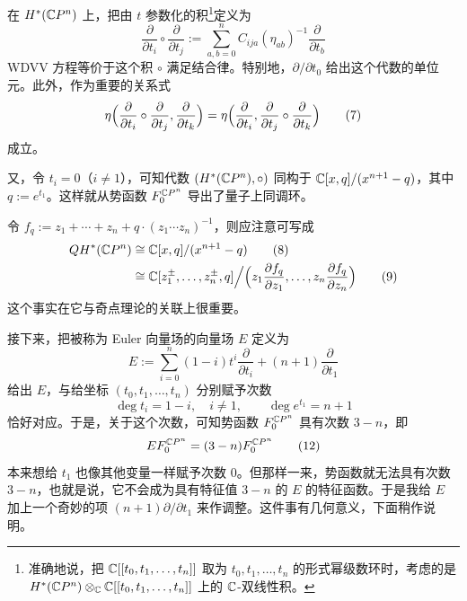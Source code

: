 在 $H^*(\mathbb{C}P^n)$ 上，把由 $t$ 参数化的积\footnote{准确地说，把 $\mathbb{C}[[t_0,t_1,\dots,t_n]]$ 取为 $t_0,t_1,\dots,t_n$ 的形式幂级数环时，考虑的是 $H^*(\mathbb{C}P^n)\otimes_{\mathbb{C}}\mathbb{C}[[t_0,t_1,\dots,t_n]]$ 上的 $\mathbb{C}$-双线性积。}定义为
\begin{equation}
  \frac{\partial}{\partial t_i}\circ\frac{\partial}{\partial t_j}
  :=\sum_{a,b=0}^{n}C_{ija}(\eta_{ab})^{-1}\frac{\partial}{\partial t_b}
  \tag{6}
\end{equation}
WDVV 方程等价于这个积 $\circ$ 满足结合律。特别地，$\partial/\partial t_0$ 给出这个代数的单位元。此外，作为重要的关系式
\begin{equation}
  \eta\Bigl(\frac{\partial}{\partial t_i}\circ\frac{\partial}{\partial t_j},\frac{\partial}{\partial t_k}\Bigr)
  =\eta\Bigl(\frac{\partial}{\partial t_i},\frac{\partial}{\partial t_j}\circ\frac{\partial}{\partial t_k}\Bigr)
  \tag{7}
\end{equation}
成立。

又，令 $t_i=0$（$i\ne 1$），可知代数 $(H^*(\mathbb{C}P^n),\circ)$ 同构于 $\mathbb{C}[x,q]/(x^{n+1}-q)$，其中 $q:=e^{t_1}$。这样就从势函数 $F_0^{\mathbb{C}P^n}$ 导出了量子上同调环。

令 $f_q:=z_1+\cdots+z_n+q\cdot(z_1\cdots z_n)^{-1}$，则应注意可写成
\begin{align}
  QH^*(\mathbb{C}P^n)&\cong \mathbb{C}[x,q]/(x^{n+1}-q)
  \tag{8}\\
  &\cong \mathbb{C}[z_1^{\pm},\dots,z_n^{\pm},q]\Big/
  \Bigl(z_1\frac{\partial f_q}{\partial z_1},\dots,z_n\frac{\partial f_q}{\partial z_n}\Bigr)
  \tag{9}
\end{align}
这个事实在它与奇点理论的关联上很重要。

接下来，把被称为 Euler 向量场的向量场 $E$ 定义为
\begin{equation}
  E:=\sum_{i=0}^{n}(1-i)t^i\frac{\partial}{\partial t_i}+(n+1)\frac{\partial}{\partial t_1}
  \tag{10}
\end{equation}
给出 $E$，与给坐标 $(t_0,t_1,\dots,t_n)$ 分别赋予次数
\begin{equation}
  \deg t_i=1-i,\quad i\ne 1,\qquad \deg e^{t_1}=n+1
  \tag{11}
\end{equation}
恰好对应。于是，关于这个次数，可知势函数 $F_0^{\mathbb{C}P^n}$ 具有次数 $3-n$，即
\begin{equation}
  EF_0^{\mathbb{C}P^n}=(3-n)F_0^{\mathbb{C}P^n}
  \tag{12}
\end{equation}
本来想给 $t_1$ 也像其他变量一样赋予次数 0。但那样一来，势函数就无法具有次数
$3-n$，也就是说，它不会成为具有特征值 $3-n$ 的 $E$ 的特征函数。于是我给 $E$ 加上一个奇妙的项 $(n+1)\partial/\partial t_1$ 来作调整。这件事有几何意义，下面稍作说明。

